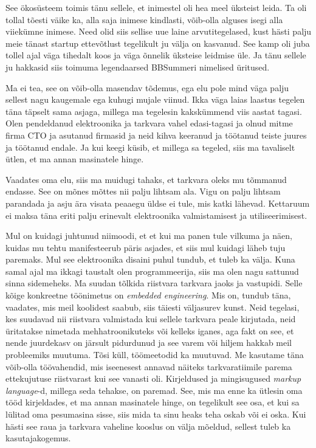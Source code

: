 See ökosüsteem toimis tänu sellele, et inimestel oli hea meel üksteist leida. 
Ta oli tollal tõesti väike ka, alla saja inimese kindlasti,  
võib-olla alguses isegi alla viiekümne inimese. Need olid siis sellise uue 
laine  arvutitegelased, kust hästi palju meie tänast  startup ettevõtlust 
tegelikult ju välja on kasvanud. See kamp oli juba tollel ajal väga tihedalt 
koos ja väga õnnelik üksteise leidmise üle. Ja tänu sellele ju hakkasid siis 
toimuma legendaarsed BBSummeri nimelised üritused. 


Ma ei tea, see on võib-olla masendav tõdemus, ega elu pole mind väga palju 
sellest nagu kaugemale ega kuhugi mujale viinud. Ikka väga laias laastus 
tegelen täna täpselt sama asjaga, millega ma tegelesin kakskümmend viis aastat 
tagasi. Olen pendeldanud elektroonika ja tarkvara vahel edasi-tagasi ja 
olnud mitme firma CTO ja  asutanud firmasid ja neid kihva keeranud ja töötanud 
teiste juures ja töötanud endale. Ja kui keegi küsib, et millega sa tegeled, 
siis ma tavaliselt ütlen, et ma annan masinatele hinge. 


Vaadates oma elu, siis ma muidugi tahaks, et tarkvara oleks mu tõmmanud 
endasse. See on mõnes mõttes nii palju  lihtsam ala. Vigu on palju 
lihtsam parandada ja asju ära visata peaaegu üldse ei tule, mis katki lähevad. 
Kettaruum ei maksa täna eriti palju erinevalt elektroonika valmistamisest ja
utiliseerimisest.

Mul on kuidagi juhtunud niimoodi, et et kui ma panen 
tule vilkuma ja näen, kuidas mu tehtu  manifesteerub päris  asjades, et 
siis mul kuidagi läheb tuju paremaks. Mul see elektroonika disaini puhul 
tundub, et tuleb ka välja. Kuna samal ajal ma ikkagi taustalt olen  
programmeerija, siis ma olen nagu sattunud sinna sidemeheks. Ma suudan tõlkida 
riistvara tarkvara jaoks ja vastupidi. Selle kõige konkreetne töönimetus on 
\emph{embedded engineering}. Mis on, tundub täna, vaadates, mis meil koolidest 
saabub, siis täiesti väljasurev kunst. Neid tegelasi, kes suudavad nii 
riistvara valmistada kui sellele tarkvara peale kirjutada, neid üritatakse 
nimetada mehhatroonikuteks või kelleks iganes, aga fakt on see, et nende 
juurdekasv on järsult pidurdunud ja see varem või hiljem hakkab meil 
probleemiks muutuma. Tõsi küll, töömeetodid ka muutuvad. Me kasutame täna
võib-olla töövahendid, mis iseenesest annavad näiteks tarkvaratiimile parema 
ettekujutuse riistvarast kui see vanasti oli. Kirjeldused ja mingisugused 
\emph{markup language}-d, millega  seda tehakse, on paremad. See, mis ma enne 
ka 
ütlesin oma tööd kirjeldades, et ma annan masinatele hinge, on 
tegelikult see osa, et kui sa lülitad oma pesumasina sisse, siis mida ta sinu 
heaks teha oskab või ei oska. Kui hästi see raua ja tarkvara vaheline kooslus 
on välja mõeldud, sellest tuleb ka kasutajakogemus. 

